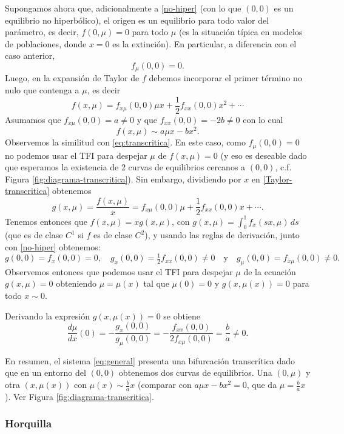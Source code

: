 \documentclass[12pt, a4paper]{amsbook}
\theoremstyle{remark}
\theoremstyle{definition}
\numberwithin{section}{chapter}
\numberwithin{subsection}{section}
\numberwithin{equation}{section}
\numberwithin{figure}{chapter}
\begin{document}
Supongamos ahora que, adicionalmente a \eqref{no-hiper} (con lo que $(0,0)$ es un equilibrio no hiperbólico), el origen es un equilibrio para todo valor del parámetro, es decir, $f(0,\mu)=0$ para todo $\mu$ (es la situación típica en modelos de poblaciones, donde $x=0$ es la extinción). En particular, a diferencia con el caso anterior,
$$
f_{\mu}(0,0)=0.
$$
Luego, en la expansión de Taylor de $f$ debemos incorporar el primer término no nulo que contenga a $\mu$, es decir
\begin{equation}\label{Taylor-transcritica}
f(x, \mu) = f_{x\mu}(0,0)\mu x + \frac12 f_{xx}(0,0)x^2 + \cdots
\end{equation}
Asumamos que $f_{x\mu}(0,0)=a\neq 0$ y que $f_{xx}(0,0)=-2b\neq 0$ con lo cual
$$
f(x,\mu)\sim a\mu x - bx^2.
$$
Observemos la similitud con \eqref{eq:transcritica}. En este caso, como $f_\mu(0,0)=0$ no podemos usar el TFI para despejar $\mu$ de $f(x,\mu)=0$ (y eso es deseable dado que esperamos la existencia de 2 curvas de equilibrios cercanos a $(0,0)$, c.f. Figura \ref{fig:diagrama-transcritica}). Sin embargo, dividiendo por $x$ en \eqref{Taylor-transcritica} obtenemos
$$
g(x,\mu) = \frac{f(x, \mu)}{x} = f_{x\mu}(0,0)\mu + \frac12 f_{xx}(0,0)x + \cdots.
$$
Tenemos entonces que $f(x,\mu)= xg(x,\mu)$, con $g(x,\mu)=\int_0^1 f_x(sx,\mu)\,ds$ (que es de clase $C^1$ si $f$ es de clase $C^2$), y usando las reglas de derivación, junto con \eqref{no-hiper} obtenemos:
\begin{equation}\label{deriv.g}
g(0,0) = f_x(0,0) = 0, \quad g_x(0,0) = \tfrac12 f_{xx}(0,0)\neq 0\quad \text{y}\quad g_{\mu}(0,0) = f_{x\mu}(0,0)\neq 0.
\end{equation}
Observemos entonces que podemos usar el TFI para despejar $\mu$ de la ecuación $g(x,\mu)=0$ obteniendo $\mu=\mu(x)$ tal que $\mu(0)=0$ y $g(x,\mu(x))=0$ para todo $x\sim 0$.

Derivando la expresión $g(x,\mu(x))=0$ se obtiene
$$
\frac{d\mu}{dx}(0) = -\frac{g_x(0,0)}{g_\mu(0,0)} = -\frac{f_{xx}(0,0)}{2f_{x\mu}(0,0)} = \frac{b}{a}\neq 0.
$$

En resumen, el sistema \eqref{eq:general} presenta una bifurcación transcrítica dado que en un entorno del $(0,0)$ obtenemos dos curvas de equilibrios. Una $(0,\mu)$ y otra $(x,\mu(x))$ con $\mu(x)\sim \frac{b}{a}x$ (comparar con $a\mu x - bx^2=0$, que da $\mu = \frac ba x$). Ver Figura \ref{fig:diagrama-transcritica}.

\subsubsection*{Horquilla}
\end{document}
